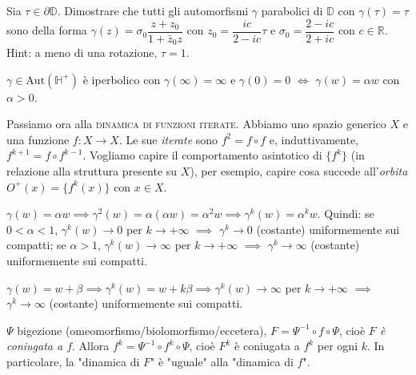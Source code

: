 \begin{exc}
  Sia $\tau \in \partial\mathbb{D}$. Dimostrare che tutti gli automorfismi $\gamma$ parabolici di $\mathbb{D}$ con $\gamma(\tau)=\tau$ sono della forma $\gamma(z)=\sigma_0\dfrac{z+z_0}{1+\bar{z}_0z}$ con $z_0=\dfrac{ic}{2-ic}\tau$ e $\sigma_0=\dfrac{2-ic}{2+ic}$ con $c \in \mathbb{R}$.
  Hint: a meno di una rotazione, $\tau=1$.
\end{exc}

\begin{ex}
  $\gamma \in \text{Aut}(\mathbb{H}^+)$ è iperbolico con $\gamma(\infty)=\infty$ e $\gamma(0)=0$ $\iff$ $\gamma(w)=\alpha w$ con $\alpha>0$.
\end{ex}

Passiamo ora alla \textsc{dinamica di funzioni iterate}. Abbiamo uno spazio generico $X$ e una funzione $f:X \rightarrow X$. Le sue \textit{iterate} sono $f^2=f \circ f$ e, induttivamente, $f^{k+1}=f \circ f^{k-1}$. Vogliamo capire il comportamento asintotico di $\{f^k\}$ (in relazione alla struttura presente su $X$), per esempio, capire cosa succede all'\textit{orbita} $O^+(x)=\{f^k(x)\}$ con $x \in X$.

\begin{ex}
  $\gamma(w)=\alpha w \implies \gamma^2(w)=\alpha(\alpha w)=\alpha^2 w \implies \gamma^k(w)=\alpha^k w$.
  Quindi: se $0<\alpha<1$, $\gamma^k(w) \rightarrow 0$ per $k \rightarrow +\infty$ $\implies$ $\gamma^k \rightarrow 0$ (costante) uniformemente sui compatti; se $\alpha>1$, $\gamma^k(w) \rightarrow \infty$ per $k \rightarrow +\infty$ $\implies$ $\gamma^k \rightarrow \infty$ (costante) uniformemente sui compatti.
\end{ex}

\begin{ex}
  $\gamma(w)=w+\beta \implies \gamma^k(w)=w+k\beta \implies \gamma^k(w) \rightarrow \infty$ per $k \rightarrow +\infty$ $\implies$ $\gamma^k \rightarrow \infty$ (costante) uniformemente sui compatti.
\end{ex}

\begin{oss}
  \begin{center}
  \end{center}
  $\Psi$ bigezione (omeomorfismo/biolomorfismo/eccetera), $F=\Psi^{-1} \circ f \circ \Psi$, cioè \textit{$F$ è coniugata a $f$}. Allora $f^k=\Psi^{-1} \circ f^k \circ \Psi$, cioè $F^k$ è coniugata a $f^k$ per ogni $k$. In particolare, la "dinamica di $F$" è "uguale" alla "dinamica di $f$".
\end{oss}

